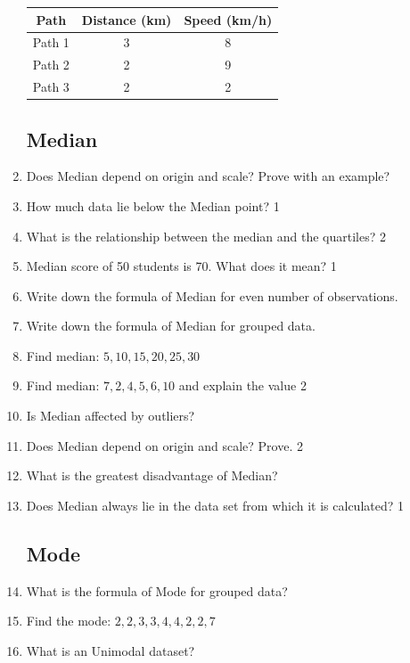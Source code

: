 \documentclass[a4paper,oneside]{book}
\begin{document}
\begin{enumerate}
    \begin{table}[h]
    \centering
\begin{tabular}{c|c|c}
Path   & Distance (km) & Speed (km/h) \\ \hline
Path 1 & 3             & 8            \\ \hline 
Path 2 & 2             & 9            \\ \hline
Path 3 & 2             & 2           
\end{tabular}
\end{table}

\subsection{Median}

    \item Does Median depend on origin and scale? Prove with an example?
    \item How much data lie below the Median point? \hfill 1
    \item What is the relationship between the median and the quartiles? \hfill 2
    \item Median score of 50 students is 70. What does it mean? \hfill 1
    \item Write down the formula of Median for even number of observations.
    \item Write down the formula of Median for grouped data. 
    \item Find median: $5,10, 15, 20, 25, 30$
    \item Find median: $7,  2,  4,  5,  6, 10$ and explain the value \hfill 2
    \item Is Median affected by outliers?
    \item Does Median depend on origin and scale? Prove. \hfill 2
    \item What is the greatest disadvantage of Median?
    \item Does Median always lie in the data set from which it is calculated? \hfill 1
    
\subsection{Mode}

    \item What is the formula of Mode for grouped data?
    \item Find the mode: $2,2,3,3,4,4,2,2,7$
    \item What is an Unimodal dataset?


\end{enumerate}
\end{document}

